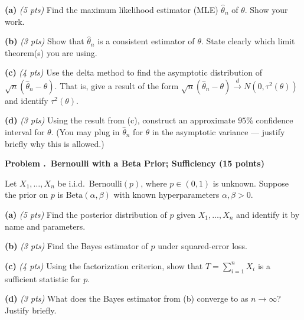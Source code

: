 \documentclass[11pt]{article}
\newcounter{probnum}
\newcommand{\prob}[2]{%
  \stepcounter{probnum}%
  \bigskip
  \noindent\textbf{Problem \theprobnum.\ #2 \hfill (#1 points)}\par\nobreak
}
\newcommand{\partlabel}[2]{\medskip\noindent\textbf{(#1)} \emph{(#2 pts)}\quad}
\begin{document}
\partlabel{a}{5}
Find the maximum likelihood estimator (MLE) $\widehat{\theta}_n$ of $\theta$. Show your work.

\vspace{1.4cm}

\partlabel{b}{3}
Show that $\widehat{\theta}_n$ is a consistent estimator of $\theta$. State clearly which limit theorem(s) you are using.

\vspace{1.4cm}

\partlabel{c}{4}
Use the delta method to find the asymptotic distribution of $\sqrt{n}(\widehat{\theta}_n - \theta)$. That is, give a result of the form
\(
\sqrt{n}(\widehat{\theta}_n - \theta) \xrightarrow{d} N(0, \tau^2(\theta))
\)
and identify $\tau^2(\theta)$.

\vspace{1.6cm}

\partlabel{d}{3}
Using the result from (c), construct an approximate $95\%$ confidence interval for $\theta$. (You may plug in $\widehat{\theta}_n$ for $\theta$ in the asymptotic variance --- justify briefly why this is allowed.)

\vfill
\newpage

\prob{15}{Bernoulli with a Beta Prior; Sufficiency}
Let $X_1, \dots, X_n$ be i.i.d.\ $\mathrm{Bernoulli}(p)$, where $p \in (0,1)$ is unknown. Suppose the prior on $p$ is $\mathrm{Beta}(\alpha, \beta)$ with known hyperparameters $\alpha, \beta > 0$.

\partlabel{a}{5}
Find the posterior distribution of $p$ given $X_1, \dots, X_n$ and identify it by name and parameters.

\vspace{2cm}

\partlabel{b}{3}
Find the Bayes estimator of $p$ under squared-error loss.

\vspace{1.6cm}

\partlabel{c}{4}
Using the factorization criterion, show that $T = \sum_{i=1}^n X_i$ is a sufficient statistic for $p$.

\vspace{1.8cm}

\partlabel{d}{3}
What does the Bayes estimator from (b) converge to as $n \to \infty$? Justify briefly.

\vfill
\newpage

\end{document}
